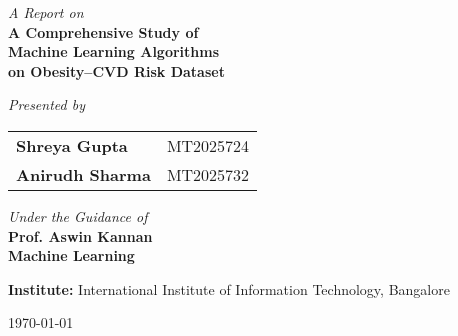 \begin{titlepage}
    \centering
    \vspace*{2cm}

    \Large
    \textit{A Report on} \\
    \Huge
    \textbf{
        A Comprehensive Study of\\
        Machine Learning Algorithms\\
        on Obesity–CVD Risk Dataset}\\

    \vspace{2cm}

    \Large
    \textit{Presented by}\\
    \begin{center}
        \begin{tabular}{@{} l l @{}}
            \textbf{Shreya Gupta}   & MT2025724 \\[0.3cm]
            \textbf{Anirudh Sharma} & MT2025732 \\
        \end{tabular}
    \end{center}

    \vspace{2cm}

    \textit{Under the Guidance of}\\
    \textbf{Prof. Aswin Kannan}\\
    \textbf{Machine Learning}\\

    \vfill

    \textbf{Institute:} International Institute of Information Technology, Bangalore\\
    {\large \today\par}

\end{titlepage}
